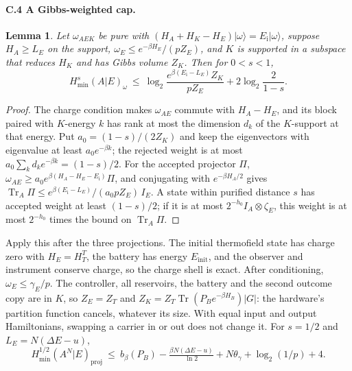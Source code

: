 \documentclass[11pt]{article}
\newtheorem{lemma}[theorem]{Lemma}
\theoremstyle{definition}
\theoremstyle{remark}
\newcommand{\Tr}{\operatorname{Tr}}
\begin{document}
\paragraph{C.4 A Gibbs-weighted cap.}
\begin{lemma}\label{lem:cap}
Let $\omega_{AEK}$ be pure with $(H_A+H_K-H_E)|\omega\rangle=E_{\mathrm i}|\omega\rangle$, suppose $H_A\ge L_E$ on the support, $\omega_E\le e^{-\beta H_E}/(pZ_E)$, and $K$ is supported in a subspace that reduces $H_K$ and has Gibbs volume $Z_K$. Then for $0<s<1$,
\[
H_{\min}^s(A|E)_\omega\ \le\ \log_2\frac{e^{\beta(E_{\mathrm i}-L_E)}Z_K}{pZ_E}+2\log_2\frac2{1-s}.
\]
\end{lemma}
\begin{proof}
The charge condition makes $\omega_{AE}$ commute with $H_A-H_E$, and its block paired with $K$-energy $k$ has rank at most the dimension $d_k$ of the $K$-support at that energy. Put $a_0=(1-s)/(2Z_K)$ and keep the eigenvectors with eigenvalue at least $a_0e^{-\beta k}$; the rejected weight is at most $a_0\sum_kd_ke^{-\beta k}=(1-s)/2$. For the accepted projector $\Pi$, $\omega_{AE}\ge a_0e^{\beta(H_A-H_E-E_{\mathrm i})}\Pi$, and conjugating with $e^{-\beta H_A/2}$ gives $\Tr_A\Pi\le e^{\beta(E_{\mathrm i}-L_E)}/(a_0pZ_E)\,I_E$. A state within purified distance $s$ has accepted weight at least $(1-s)/2$; if it is at most $2^{-h_0}I_A\otimes\zeta_E$, this weight is at most $2^{-h_0}$ times the bound on $\Tr_A\Pi$.
\end{proof}
Apply this after the three projections. The initial thermofield state has charge zero with $H_E=H_T^T$, the battery has energy $E_{\mathrm{init}}$, and the observer and instrument conserve charge, so the charge shell is exact. After conditioning, $\omega_E\le\gamma_E/p$. The controller, all reservoirs, the battery and the second outcome copy are in $K$, so $Z_E=Z_T$ and $Z_K=Z_T\Tr(P_Be^{-\beta H_B})|G|$: the hardware's partition function cancels, whatever its size. With equal input and output Hamiltonians, swapping a carrier in or out does not change it. For $s=1/2$ and $L_E=N(\Delta E-u)$,
\begin{equation}\label{eq:cap}
H_{\min}^{1/2}(A^N|E)_{\mathrm{proj}}\ \le\ b_\beta(P_B)-\tfrac{\beta N(\Delta E-u)}{\ln2}+N\theta_\gamma+\log_2(1/p)+4.
\end{equation}
\end{document}
